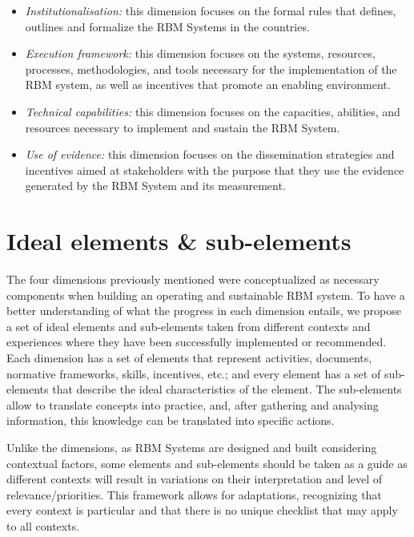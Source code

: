 \documentclass[
]{book}
\begin{document}
\begin{itemize}
\item
  \emph{Institutionalisation:} this dimension focuses on the formal rules that defines, outlines and formalize the RBM Systems in the countries.
\item
  \emph{Execution framework:} this dimension focuses on the systems, resources, processes, methodologies, and tools necessary for the implementation of the RBM system, as well as incentives that promote an enabling environment.
\item
  \emph{Technical capabilities:} this dimension focuses on the capacities, abilities, and resources necessary to implement and sustain the RBM System.
\item
  \emph{Use of evidence:} this dimension focuses on the dissemination strategies and incentives aimed at stakeholders with the purpose that they use the evidence generated by the RBM System and its measurement.
\end{itemize}

\hypertarget{ideal-elements-sub-elements}{%
\section{Ideal elements \& sub-elements}\label{ideal-elements-sub-elements}}

The four dimensions previously mentioned were conceptualized as necessary components when building an operating and sustainable RBM system. To have a better understanding of what the progress in each dimension entails, we propose a set of ideal elements and sub-elements taken from different contexts and experiences where they have been successfully implemented or recommended. Each dimension has a set of elements that represent activities, documents, normative frameworks, skills, incentives, etc.; and every element has a set of sub-elements that describe the ideal characteristics of the element. The sub-elements allow to translate concepts into practice, and, after gathering and analysing information, this knowledge can be translated into specific actions.

Unlike the dimensions, as RBM Systems are designed and built considering contextual factors, some elements and sub-elements should be taken as a guide as different contexts will result in variations on their interpretation and level of relevance/priorities. This framework allows for adaptations, recognizing that every context is particular and that there is no unique checklist that may apply to all contexts.
\end{document}
